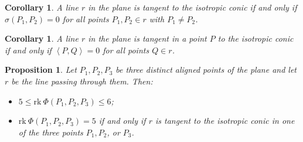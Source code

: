 \documentclass[12pt, a4paper, reqno, captions=tableheading,bibliography=totoc]{scrartcl}
\theoremstyle{plain}
\newtheorem{prop}[lemma]{Proposition}
\newtheorem{corollary}[lemma]{Corollary}
\theoremstyle{definition}
\newcommand{\scl}[2]{\left\langle {#1}, {#2} \right\rangle}
\begin{document}
\begin{corollary}
A line $r$ in the plane is tangent to the isotropic conic if and only
if $\sigma(P_1, P_2) = 0$ for all points $P_1, P_2 \in r$ with $P_1 \neq P_2$.
\end{corollary}

\begin{corollary}
A line $r$ in the plane is tangent in a point $P$ to the isotropic conic
if and only if $\scl{P}{Q} = 0$ for all points $Q \in r$.
\end{corollary}

\begin{prop}
\label{proposition:three_aligned_ranks}
Let $P_1, P_2, P_3$ be three distinct aligned points of the plane and let
$r$ be the line passing through them. Then:
\begin{itemize}
\item $5 \leq \text{rk}\ \Phi(P_1, P_2, P_3) \leq 6$;
\item
$\text{rk}\ \Phi(P_1, P_2, P_3) = 5$ if and only if $r$ is tangent
to the isotropic conic in one of the three points $P_1, P_2$, or $P_3$.
\end{itemize}
\end{prop}
\end{document}
